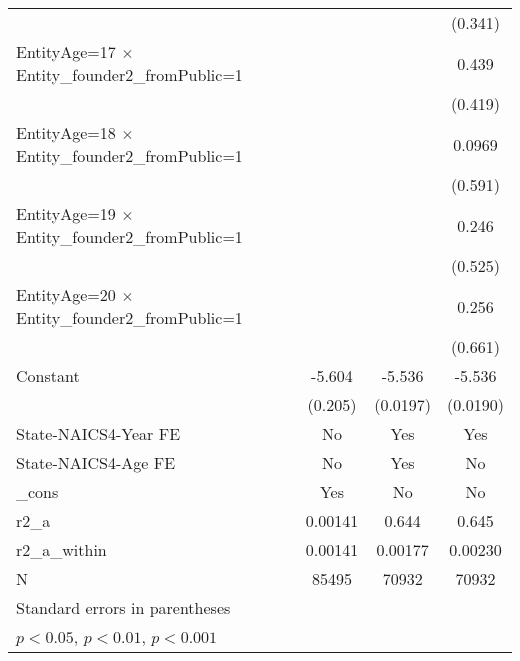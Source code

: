 {\begin{tabular}{l*{3}{c}}
                    &                     &                     &     (0.341)         \\
[1em]
EntityAge=17 $\times$ Entity\_founder2\_fromPublic=1&                     &                     &       0.439         \\
                    &                     &                     &     (0.419)         \\
[1em]
EntityAge=18 $\times$ Entity\_founder2\_fromPublic=1&                     &                     &      0.0969         \\
                    &                     &                     &     (0.591)         \\
[1em]
EntityAge=19 $\times$ Entity\_founder2\_fromPublic=1&                     &                     &       0.246         \\
                    &                     &                     &     (0.525)         \\
[1em]
EntityAge=20 $\times$ Entity\_founder2\_fromPublic=1&                     &                     &       0.256         \\
                    &                     &                     &     (0.661)         \\
[1em]
Constant            &      -5.604\sym{***}&      -5.536\sym{***}&      -5.536\sym{***}\\
                    &     (0.205)         &    (0.0197)         &    (0.0190)         \\
[1em]
State-NAICS4-Year FE&          No         &         Yes         &         Yes         \\
[1em]
State-NAICS4-Age FE &          No         &         Yes         &          No         \\
[1em]
\_cons              &         Yes         &          No         &          No         \\
\hline
r2\_a                &     0.00141         &       0.644         &       0.645         \\
r2\_a\_within         &     0.00141         &     0.00177         &     0.00230         \\
N                   &       85495         &       70932         &       70932         \\
\hline\hline
\multicolumn{4}{l}{\footnotesize Standard errors in parentheses}\\
\multicolumn{4}{l}{\footnotesize \sym{*} \(p<0.05\), \sym{**} \(p<0.01\), \sym{***} \(p<0.001\)}\\
\end{tabular}
}
